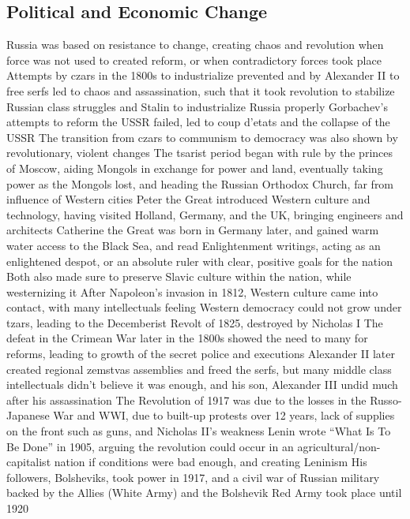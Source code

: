 \documentclass[11 pt, twoside]{article}
\newenvironment{outline*}
{
	\begin{outline}[enumerate]
	}
	{\end{outline}
}
\begin{document}
\subsection{Political and Economic Change}
\begin{outline*}
\1 Russia was based on resistance to change, creating chaos and revolution when force was not used to created reform, or when contradictory forces took place
\2 Attempts by czars in the 1800s to industrialize prevented and by Alexander II to free serfs led to chaos and assassination, such that it took revolution to stabilize Russian class struggles and Stalin to industrialize Russia properly
\2 Gorbachev's attempts to reform the USSR failed, led to coup d'etats and the collapse of the USSR
\2 The transition from czars to communism to democracy was also shown by revolutionary, violent changes
\1 The tsarist period began with rule by the princes of Moscow, aiding Mongols in exchange for power and land, eventually taking power as the Mongols lost, and  heading the Russian Orthodox Church, far from influence of Western cities
\2 Peter the Great introduced Western culture and technology, having visited Holland, Germany, and the UK, bringing engineers and architects 
\2 Catherine the Great was born in Germany later, and gained warm water access to the Black Sea, and read Enlightenment writings, acting as an enlightened despot, or an absolute ruler with clear, positive goals for the nation
\3 Both also made sure to preserve Slavic culture within the nation, while westernizing it
\2 After Napoleon's invasion in 1812, Western culture came into contact, with many intellectuals feeling Western democracy could not grow under tzars, leading to the Decemberist Revolt of 1825, destroyed by Nicholas I
\3 The defeat in the Crimean War later in the 1800s showed the need to many for reforms, leading to growth of the secret police and executions
\3 Alexander II later created regional zemstvas assemblies and freed the serfs, but many middle class intellectuals didn't believe it was enough, and his son, Alexander III undid much after his assassination
\1 The Revolution of 1917 was due to the losses in the Russo-Japanese War and WWI, due to built-up protests over 12 years, lack of supplies on the front such as guns, and Nicholas II's weakness
\2 Lenin wrote ``What Is To Be Done'' in 1905, arguing the revolution could occur in an agricultural/non-capitalist nation if conditions were bad enough, and creating Leninism
\3 His followers, Bolsheviks, took power in 1917, and a civil war of Russian military backed by the Allies (White Army) and the Bolshevik Red Army took place until 1920

\end{outline*}
\end{document}
